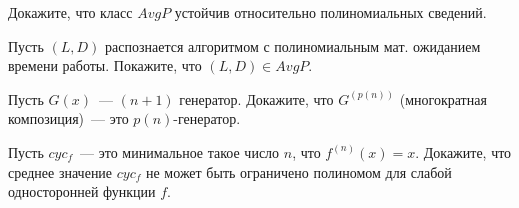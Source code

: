\setcounter{curtask}{31}


\begin{task}
    Докажите, что класс $AvgP$ устойчив относительно полиномиальных сведений.
\end{task}

\begin{task}
    Пусть $(L, D)$ распознается алгоритмом с полиномиальным мат. ожиданием времени
    работы. Покажите, что $(L, D) \in AvgP$.
\end{task}

\begin{task}
    Пусть $G(x)$~--- $(n + 1)$ генератор. Докажите, что $G^{(p(n))}$ (многократная
    композиция)~--- это $p(n)$-генератор.
\end{task}

\begin{task}
    Пусть $cyc_f$~--- это минимальное такое число $n$, что $f^{(n)}(x) = x$. Докажите,
    что среднее значение $cyc_f$ не может быть ограничено полиномом для слабой
    односторонней функции $f$.
\end{task}

